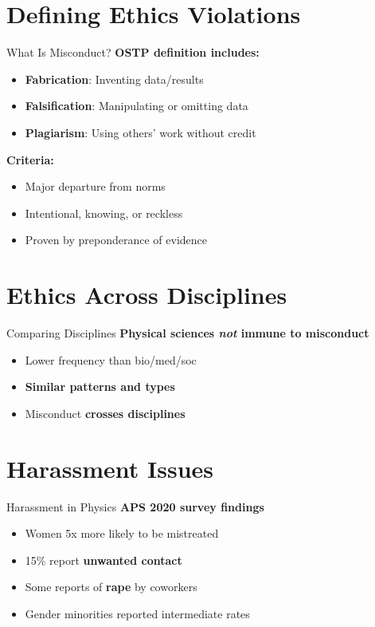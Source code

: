 \section{Defining Ethics Violations}
\begin{frame}{What Is Misconduct?}
\textbf{OSTP definition includes:}
\begin{itemize}
  \item<1-> \textbf{Fabrication}: Inventing data/results
  \item<2-> \textbf{Falsification}: Manipulating or omitting data
  \item<3-> \textbf{Plagiarism}: Using others' work without credit
\end{itemize}
\textbf{Criteria:}
\begin{itemize}
  \item<4-> Major departure from norms
  \item<5-> Intentional, knowing, or reckless
  \item<6-> Proven by preponderance of evidence
\end{itemize}
\end{frame}

\section{Ethics Across Disciplines}
\begin{frame}{Comparing Disciplines}
\textbf{Physical sciences \textit{not} immune to misconduct}
\begin{itemize}
  \item<1-> Lower frequency than bio/med/soc
  \item<2-> \textbf{Similar patterns and types}
  \item<3-> \alert{Misconduct \textbf{crosses disciplines}}
\end{itemize}
\end{frame}

\section{Harassment Issues}
\begin{frame}{Harassment in Physics}
\textbf{APS 2020 survey findings}
\begin{itemize}
  \item<1-> Women 5x more likely to be mistreated
  \item<2-> 15\% report \textbf{unwanted contact}
  \item<3-> \alert{Some reports of \textbf{rape} by coworkers}
  \item<4-> Gender minorities reported intermediate rates
\end{itemize}
\end{frame}

